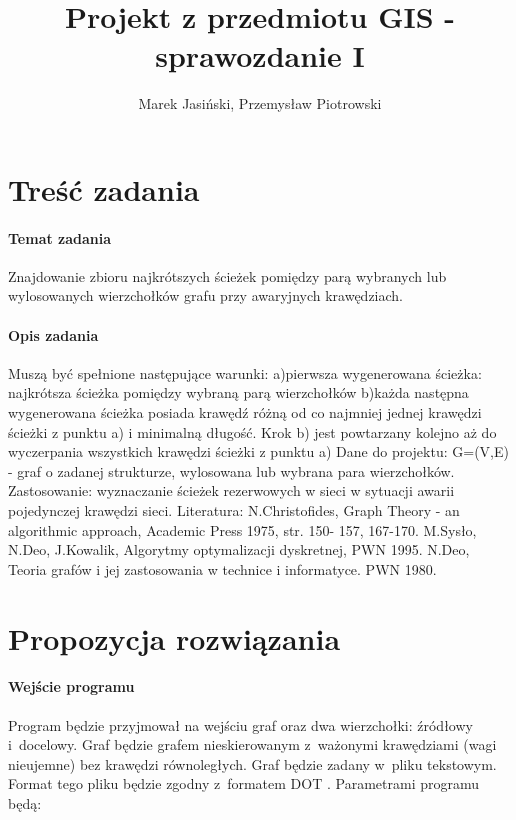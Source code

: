 \documentclass[a4paper, 12pt]{article}
\title {Projekt z przedmiotu GIS - sprawozdanie I}
\author{Marek Jasiński, Przemysław Piotrowski}
\begin{document}
\maketitle

\section{Treść zadania}

\paragraph{Temat zadania}
Znajdowanie zbioru najkrótszych ścieżek pomiędzy parą wybranych lub wylosowanych wierzchołków grafu przy awaryjnych krawędziach.

\paragraph{Opis zadania}
Muszą być spełnione następujące warunki: a)pierwsza wygenerowana ścieżka: najkrótsza ścieżka pomiędzy wybraną parą wierzchołków b)każda następna wygenerowana ścieżka posiada krawędź różną od co najmniej jednej krawędzi ścieżki z punktu a) i minimalną długość. Krok b) jest powtarzany kolejno aż do wyczerpania wszystkich krawędzi ścieżki z punktu a) Dane do projektu: G=(V,E) - graf o zadanej strukturze, wylosowana lub wybrana para wierzchołków. Zastosowanie: wyznaczanie ścieżek rezerwowych w sieci w sytuacji awarii pojedynczej krawędzi sieci. Literatura: N.Christofides, Graph Theory - an algorithmic approach, Academic Press 1975, str. 150- 157, 167-170. M.Sysło, N.Deo, J.Kowalik, Algorytmy optymalizacji dyskretnej, PWN 1995. N.Deo, Teoria grafów i jej zastosowania w technice i informatyce. PWN 1980.

\section{Propozycja rozwiązania}

\paragraph{Wejście programu}
Program będzie przyjmował na wejściu graf oraz dwa wierzchołki: źródłowy i~docelowy. Graf będzie grafem nieskierowanym z~ważonymi krawędziami (wagi nieujemne) bez krawędzi równoległych. Graf będzie zadany w~pliku tekstowym. Format tego pliku będzie zgodny z~formatem DOT \cite{dot}. Parametrami programu będą:
\end{document}
